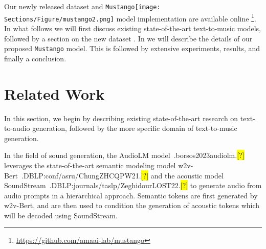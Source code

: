 \documentclass[11pt]{article}
\let\realcite\cite
\renewcommand{\cite}[1]{\ifx.#1.\hl{[?]}\else\realcite{#1}\fi}
\newcommand{\model}{\texttt{Mustango}}
\newcommand{\modelemoji}{\model{}\texttt{[image: Sections/Figure/mustango2.png]}}
\begin{document}
Our newly released \dataset{} dataset and \modelemoji{} model implementation are available online \footnote{\url{https://github.com/amaai-lab/mustango}}. In what follows we will first discuss existing state-of-the-art text-to-music models, followed by a section on the new dataset \dataset{}. In  we will describe the details of our proposed \model{} model. This is followed by extensive experiments, results, and finally a conclusion.  































































%
 \section{Related Work}\label{sec:relw}






In this section, we begin by describing existing state-of-the-art research on text-to-audio generation, followed by the more specific domain of text-to-music generation.  


In the field of sound generation, the AudioLM model~\cite{borsos2023audiolm} leverages the state-of-the-art semantic modeling model w2v-Bert~\cite{DBLP:conf/asru/ChungZHCQPW21} and the acoustic model SoundStream~\cite{DBLP:journals/taslp/ZeghidourLOST22} to generate audio from audio prompts in a hierarchical approach. Semantic tokens are first generated by w2v-Bert, and are then used to condition the generation of acoustic tokens which will be decoded using SoundStream. 
\end{document}
